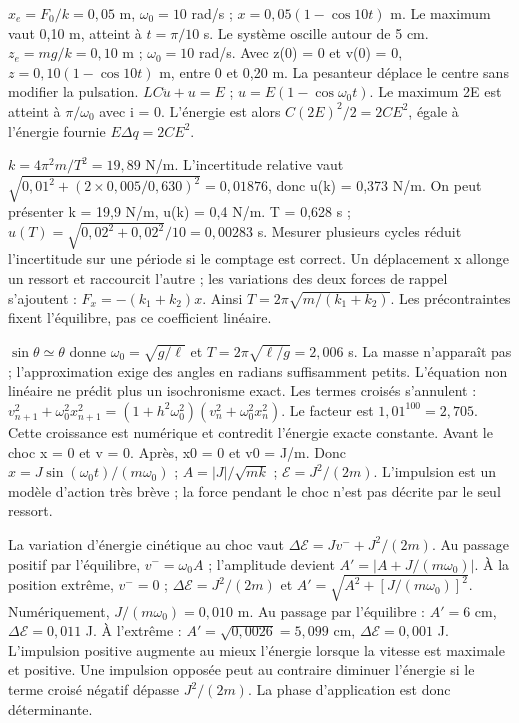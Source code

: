 $x_e=F_0/k=0{,}05$ m, $\omega_0=10$ rad/s ; $x=0{,}05(1-\cos10t)$ m. Le maximum vaut 0,10 m, atteint à $t=\pi/10$ s. Le système oscille autour de 5 cm.
$z_e=mg/k=0{,}10$ m ; $\omega_0=10$ rad/s. Avec z(0) = 0 et v(0) = 0, $z=0{,}10(1-\cos10t)$ m, entre 0 et 0,20 m. La pesanteur déplace le centre sans modifier la pulsation.
$LC\ddot u+u=E$ ; $u=E(1-\cos\omega_0t)$. Le maximum 2E est atteint à $\pi/\omega_0$ avec i = 0. L’énergie est alors $C(2E)^2/2=2CE^2$, égale à l’énergie fournie $E\Delta q=2CE^2$.


$k=4\pi^2m/T^2=19{,}89$ N/m. L’incertitude relative vaut $\sqrt{0{,}01^2+(2\times0{,}005/0{,}630)^2}=0{,}01876$, donc u(k) = 0,373 N/m. On peut présenter k = 19,9 N/m, u(k) = 0,4 N/m.
T = 0,628 s ; $u(T)=\sqrt{0{,}02^2+0{,}02^2}/10=0{,}00283$ s. Mesurer plusieurs cycles réduit l’incertitude sur une période si le comptage est correct.
Un déplacement x allonge un ressort et raccourcit l’autre ; les variations des deux forces de rappel s’ajoutent : $F_x=-(k_1+k_2)x$. Ainsi $T=2\pi\sqrt{m/(k_1+k_2)}$. Les précontraintes fixent l’équilibre, pas ce coefficient linéaire.


$\sin\theta\simeq\theta$ donne $\omega_0=\sqrt{g/\ell}$ et $T=2\pi\sqrt{\ell/g}=2{,}006$ s. La masse n’apparaît pas ; l’approximation exige des angles en radians suffisamment petits. L’équation non linéaire ne prédit plus un isochronisme exact.
Les termes croisés s’annulent : $v_{n+1}^2+\omega_0^2x_{n+1}^2=(1+h^2\omega_0^2)(v_n^2+\omega_0^2x_n^2)$. Le facteur est $1{,}01^{100}=2{,}705$. Cette croissance est numérique et contredit l’énergie exacte constante.
Avant le choc x = 0 et v = 0. Après, x0 = 0 et v0 = J/m. Donc $x=J\sin(\omega_0t)/(m\omega_0)$ ; $A=|J|/\sqrt{mk}$ ; $\mathcal E=J^2/(2m)$. L’impulsion est un modèle d’action très brève ; la force pendant le choc n’est pas décrite par le seul ressort.


La variation d’énergie cinétique au choc vaut $\Delta\mathcal E=Jv^-+J^2/(2m)$. Au passage positif par l’équilibre, $v^-=\omega_0A$ ; l’amplitude devient $A'=|A+J/(m\omega_0)|$.
À la position extrême, $v^-=0$ ; $\Delta\mathcal E=J^2/(2m)$ et $A'=\sqrt{A^2+[J/(m\omega_0)]^2}$.
Numériquement, $J/(m\omega_0)=0{,}010$ m. Au passage par l’équilibre : $A'=6$ cm, $\Delta\mathcal E=0{,}011$ J. À l’extrême : $A'=\sqrt{0{,}0026}=5{,}099$ cm, $\Delta\mathcal E=0{,}001$ J.
L’impulsion positive augmente au mieux l’énergie lorsque la vitesse est maximale et positive. Une impulsion opposée peut au contraire diminuer l’énergie si le terme croisé négatif dépasse $J^2/(2m)$. La phase d’application est donc déterminante.


